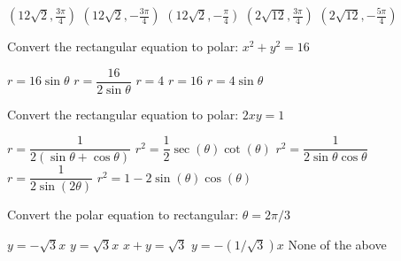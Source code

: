\documentclass[11pt]{exam}
\begin{document}
\begin{questions}
\begin{minipage}{\linewidth}
\begin{choices}
	\choice $\left(12 \sqrt{2},\frac{3 \pi }{4}\right)$
	\CorrectChoice $\left(12 \sqrt{2},-\frac{3 \pi }{4}\right)$
	\choice $\left(12 \sqrt{2},-\frac{\pi }{4}\right)$
	\choice $\left(2 \sqrt{12},\frac{3 \pi }{4}\right)$
	\choice $\left(2 \sqrt{12},-\frac{5 \pi }{4}\right)$
\end{choices} \answerline

\end{minipage}

\begin{minipage}{\linewidth}



\question Convert the rectangular equation to polar: $x^2 + y^2 = 16$

\begin{choices}
	\choice $r = 16 \sin \theta$
	\choice $r = \dfrac{16}{2\sin\theta}$
	\CorrectChoice $r = 4$
	\choice $r=16$
	\choice $r = 4 \sin \theta$
\end{choices} \answerline
\end{minipage}

\begin{minipage}{\linewidth}



\question Convert the rectangular equation to polar: $2xy=1$

\begin{choices}
	\choice $r = \dfrac{1}{2(\sin\theta + \cos\theta)}$
	\choice $r^2 = \dfrac{1}{2}\sec(\theta)\cot(\theta)$
	\CorrectChoice $r^2 = \dfrac{1}{2\sin\theta\cos\theta}$
	\choice $r = \dfrac{1}{2\sin(2\theta)}$
	\choice $r^2 = 1 - 2\sin(\theta)\cos(\theta)$
\end{choices} \answerline
\end{minipage}

\begin{minipage}{\linewidth}


\question Convert the polar equation to rectangular: $\theta = 2\pi/3$

\begin{choices}
	\correctchoice $y = -\sqrt3 x$
	\choice $y = \sqrt3 x$
	\choice $x+y = \sqrt3$
	\choice $y = -(1/\sqrt3) x$
	\choice None of the above
\end{choices} \answerline


\end{minipage}

\begin{minipage}{\linewidth}



\end{minipage}
\end{questions}
\end{document}
